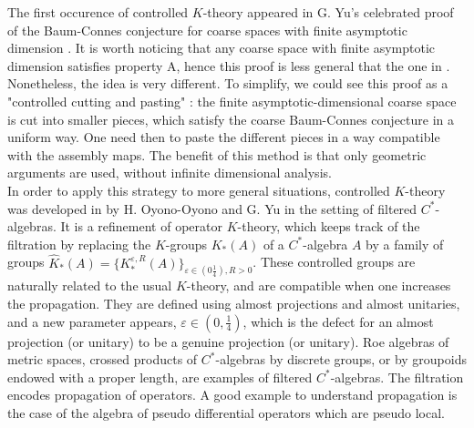 The first occurence of controlled $K$-theory appeared in G. Yu's celebrated proof of the Baum-Connes conjecture for coarse spaces with finite asymptotic dimension \cite{Yu1}. It is worth noticing that any coarse space with finite asymptotic dimension satisfies property A, hence this proof is less general that the one in \cite{Yu2}. Nonetheless, the idea is very different. To simplify, we could see this proof as a "controlled cutting and pasting" : the finite asymptotic-dimensional coarse space is cut into smaller pieces, which satisfy the coarse Baum-Connes conjecture in a uniform way. One need then to paste the different pieces in a way compatible with the assembly maps. The benefit of this method is that only geometric arguments are used, without infinite dimensional analysis. \\ %

In order to apply this strategy to more general situations, controlled $K$-theory was developed in \cite{OY2} by H. Oyono-Oyono and G. Yu in the setting of filtered $C^*$-algebras. It is a refinement of operator $K$-theory, which keeps track of the filtration by replacing the $K$-groups $K_*(A)$ of a $C^*$-algebra $A$ by a family of groups $\hat K_*(A)= \{K_*^{\varepsilon,R}(A)\}_{\varepsilon\in (0\frac{1}{4}),R>0}$. These controlled groups are naturally related to the usual $K$-theory, and are compatible when one increases the propagation. They are defined using almost projections and almost unitaries, and a new parameter appears, $\varepsilon\in (0 , \frac{1}{4})$, which is the defect for an almost projection (or unitary) to be a genuine projection (or unitary). Roe algebras of metric spaces, crossed products of $C^*$-algebras by discrete groups, or by groupoids endowed with a proper length, are examples of filtered $C^*$-algebras. The filtration encodes propagation of operators. A good example to understand propagation is the case of the algebra of pseudo differential operators which are pseudo local.\\%

